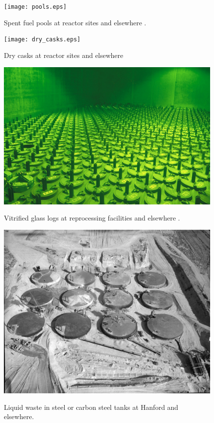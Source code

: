 

  \begin{figure}[htbp!]
    \begin{center}
    \begin{minipage}[t]{0.45\textwidth}
      \texttt{[image: pools.eps]}
      \caption{Spent fuel pools at reactor sites and elsewhere \cite{pools}.}
        \label{fig:pools}
      \texttt{[image: dry\_casks.eps]}
      \caption{Dry casks at reactor sites and elsewhere \cite{casks}}
        \label{fig:casks}
    \end{minipage}
    \hspace{0.01\textwidth}
    \begin{minipage}[t]{0.45\textwidth}
      \includegraphics{logs.eps}
        \caption{Vitrified glass logs at reprocessing facilities and elsewhere 
          \cite{logs}.}
        \label{fig:logs}
      \includegraphics{tanks.eps}
        \caption{Liquid waste in steel or carbon steel tanks at Hanford and 
          elsewhere\cite{tanks}.}
        \label{fig:tanks}
    \end{minipage}
    \end{center}
  \end{figure}
